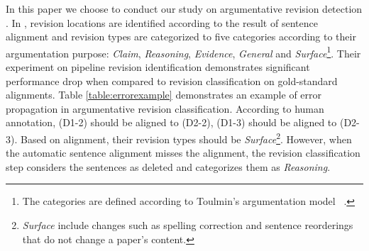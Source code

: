 \documentclass[11pt]{article}
\begin{document}
In this paper we choose to conduct our study on argumentative revision detection \cite{zhang-litman:2015:bea,zhang-litman:2016:N16-1}. In \cite{zhang-litman:2015:bea}, revision locations are identified according to the result of sentence alignment and revision types are categorized to five categories according to their argumentation purpose: \textit{Claim}, \textit{Reasoning}, \textit{Evidence}, \textit{General} and \textit{Surface}\footnote{The categories are defined according to Toulmin's argumentation model ~\cite{toulmin2003uses}.}. Their experiment on pipeline revision identification demonstrates significant performance drop when compared to revision classification on gold-standard alignments. Table \ref{table:errorexample} demonstrates an example of error propagation in argumentative revision classification. According to human annotation, (D1-2) should be aligned to (D2-2), (D1-3) should be aligned to (D2-3). Based on alignment, their revision types should be \textit{Surface}\footnote{\textit{Surface} include changes such as spelling correction and sentence reorderings that do not change a paper's content.}. However, when the automatic sentence alignment misses the alignment, the revision classification step considers the sentences as deleted and categorizes them as \textit{Reasoning}. 
\end{document}
